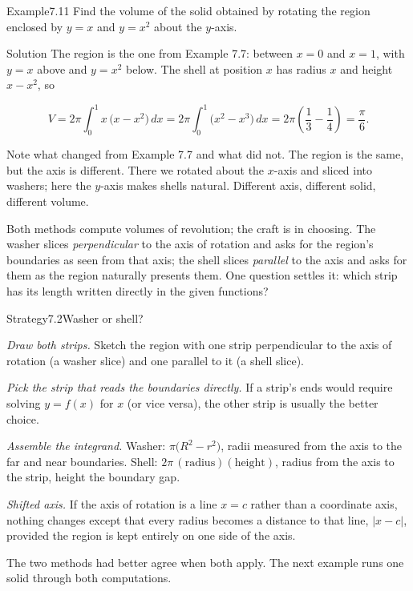 \documentclass[a4paper,12pt,oneside]{memoir}
\begin{document}
\begin{workedexample}
\begin{envexample}{Example}{7.11}{}
Find the volume of the solid obtained by rotating the region enclosed by \(y = x\) and \(y = x^{2}\) about the \(y\)-axis.
\end{envexample}
\begin{envsolution}{Solution}{}{}
The region is the one from Example 7.7: between \(x = 0\) and \(x = 1\), with \(y = x\) above and \(y = x^{2}\) below. The shell at position \(x\) has radius \(x\) and height \(x - x^{2}\), so

\[ V = 2\pi \int_{0}^{1} x\,\bigl(x - x^{2}\bigr)\,dx = 2\pi \int_{0}^{1} \bigl(x^{2} - x^{3}\bigr)\,dx = 2\pi\left(\frac{1}{3} - \frac{1}{4}\right) = \frac{\pi}{6}. \]

Note what changed from Example 7.7 and what did not. The region is the same, but the axis is different. There we rotated about the \(x\)-axis and sliced into washers; here the \(y\)-axis makes shells natural. Different axis, different solid, different volume. \qedmark
\end{envsolution}
\end{workedexample}
Both methods compute volumes of revolution; the craft is in choosing. The washer slices \emph{perpendicular} to the axis of rotation and asks for the region’s boundaries as seen from that axis; the shell slices \emph{parallel} to the axis and asks for them as the region naturally presents them. One question settles it: which strip has its length written directly in the given functions?

\begin{envstrategy}{Strategy}{7.2}{Washer or shell?}
\begin{steps}
  \item \emph{Draw both strips.} Sketch the region with one strip perpendicular to the axis of rotation (a washer slice) and one parallel to it (a shell slice).
  \item \emph{Pick the strip that reads the boundaries directly.} If a strip’s ends would require solving \(y = f(x)\) for \(x\) (or vice versa), the other strip is usually the better choice.
  \item \emph{Assemble the integrand.} Washer: \(\pi\bigl(R^{2} - r^{2}\bigr)\), radii measured from the axis to the far and near boundaries. Shell: \(2\pi\,(\text{radius})(\text{height})\), radius from the axis to the strip, height the boundary gap.
  \item \emph{Shifted axis.} If the axis of rotation is a line \(x = c\) rather than a coordinate axis, nothing changes except that every radius becomes a distance to that line, \(\lvert x - c\rvert\), provided the region is kept entirely on one side of the axis.
\end{steps}
\end{envstrategy}
The two methods had better agree when both apply. The next example runs one solid through both computations.
\end{document}

